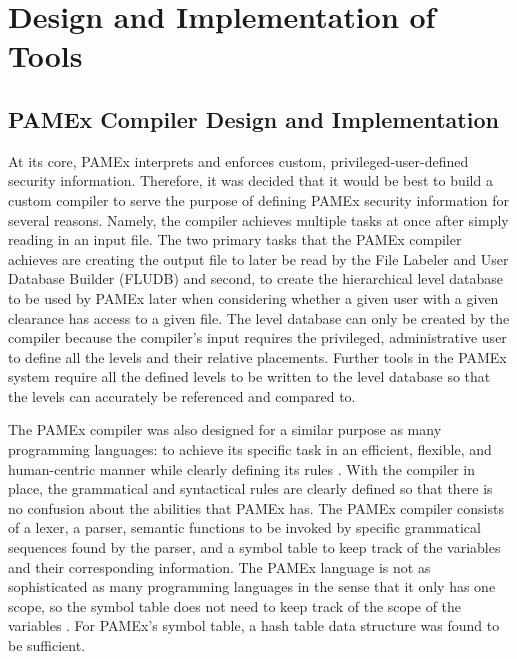 \section{Design and Implementation of Tools}																	
\label{sec:Tools}
\vspace{\baselineskip}

\subsection{PAMEx Compiler Design and Implementation} 
\par 
\vspace{\baselineskip}
\hspace{1em}
At its core, PAMEx interprets and enforces custom, 
privileged-user-defined security information. Therefore, it was decided that it would be best to build a custom compiler to serve the purpose of defining 
PAMEx security information for several reasons. Namely, the compiler 
achieves multiple tasks at once after simply reading in an input file. 
The two primary tasks that the PAMEx compiler achieves are creating the 
output file to later be read by the File Labeler and User Database 
Builder (FLUDB) and second, to create the hierarchical level database 
to be used by PAMEx later when considering whether a given user with a given clearance has access to a given file. 
The level database can only be created by the compiler because the compiler’s 
input requires the privileged, administrative user to define all the 
levels and their relative placements. Further tools in the PAMEx system 
require all the defined levels to be written to the level database 
so that the levels can accurately be referenced and compared to.  

The PAMEx compiler was also designed for a similar purpose as many 
programming languages: to achieve its specific task in an 
efficient, flexible, and human-centric manner while clearly defining its rules \cite{levine1995}. With 
the compiler in place, the grammatical and syntactical rules are 
clearly defined so that there is no confusion about the abilities that 
PAMEx has. 
The PAMEx compiler consists of a lexer, a parser, semantic functions 
to be invoked by specific grammatical sequences found by the parser, 
and a symbol table to keep track of the variables and their corresponding 
information. The PAMEx language is not as sophisticated as many 
programming languages in the sense that it only has one scope, so the 
symbol table does not need to keep track of the scope of the variables \cite{levine2009}. For 
PAMEx’s symbol table, a hash table data structure was found to be sufficient. 

